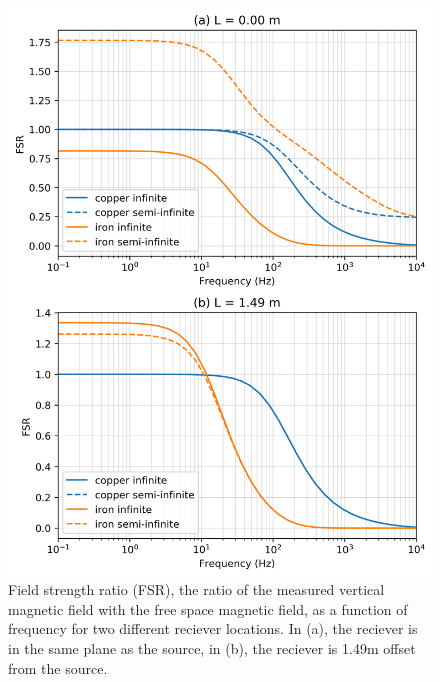 \begin{figure}
    \begin{center}
    \includegraphics[width=0.6\columnwidth]{figures/AugustinFSR.png}
    \end{center}
\caption{
    Field strength ratio (FSR), the ratio of the measured vertical magnetic field with the free space magnetic field, as a function of frequency for two different reciever locations.
    In (a), the reciever is in the same plane as the source, in (b), the reciever is 1.49m offset from the source.
}
\label{fig:AugustinFSR}
\end{figure}
